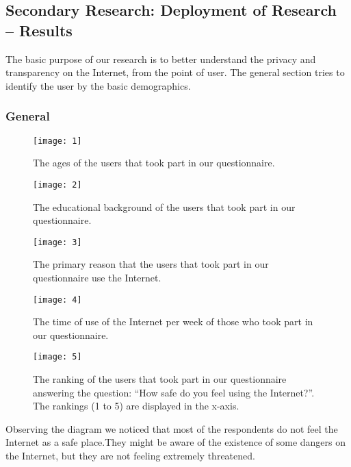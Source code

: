 \vspace{1cm}
\subsection{Secondary Research: Deployment of Research -- Results}
\vspace{0.7cm}

The basic purpose of our research is to better understand  the privacy and 
transparency on the Internet, from the point of  user.
The general section tries to identify the user by the basic demographics.

\subsubsection{General}

\begin{figure}[H]
\centering
\texttt{[image: 1]}
\caption{The ages of the users that took part in our questionnaire.}
\end{figure}

\begin{figure}[H]
\centering
\texttt{[image: 2]}
\caption{The educational background of the users that took part in our 
questionnaire.}
\end{figure}

\begin{figure}[H]
\centering
\texttt{[image: 3]}
\caption{The primary reason that the users that took part in our questionnaire 
use the Internet.}
\end{figure}

\begin{figure}[H]
\centering
\texttt{[image: 4]}
\caption{The time of use of the Internet per week of those who took part in our 
questionnaire.}
\end{figure}

\begin{figure}[H]
\centering
\texttt{[image: 5]}
\caption{The ranking of the users that took part in our questionnaire answering 
the question: ``How safe do you feel using the Internet?''. The rankings (1 to 5) 
are displayed in the x-axis.}
\end{figure}

Observing the diagram we noticed that most of the respondents  do not feel the 
Internet as a safe place.They might be  aware of the existence of some dangers 
on the Internet, but they are not feeling extremely threatened.

